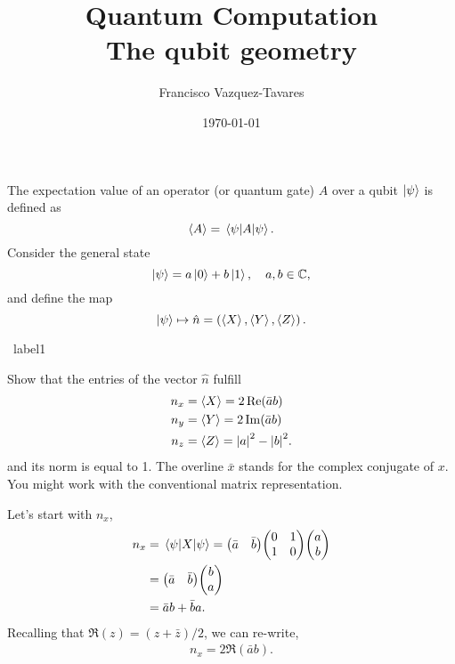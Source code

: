 \documentclass[a4paper]{tufte-handout} %
\title{Quantum Computation\\ The qubit geometry}
\author{Francisco Vazquez-Tavares}
\date{\today} %
\begin{document}
\maketitle %
\justifying


The expectation value of an operator (or quantum gate) $A$ over a qubit $\ket{\psi}$ is defined as
\begin{equation}
    \expval{A} = \expval{A}{\psi}.
\end{equation}
Consider the general state
\begin{equation}
    \ket{\psi} = a\ket{0} + b\ket{1},\quad a,b\in\mathbb{C},
\end{equation}
and define the map
\begin{equation}
    \ket{\psi} \mapsto\hat{n} = \left(\expval{X},\expval{Y},\expval{Z}\right).
\end{equation}

\begin{prob}{~}{label1}

    Show that the entries of the vector $\hat{n}$ fulfill
    \begin{align*}
        n_x &= \expval{X} = 2\Re(\bar{a}b) \\
        n_y &= \expval{Y} = 2\Im(\bar{a}b) \\
        n_z &= \expval{Z} = \abs{a}^2 - \abs{b}^2.
    \end{align*}
    and its norm is equal to \num{1}.
    The overline $\bar{x}$ stands for the complex conjugate of $x$.
    You might work with the conventional matrix representation.

\end{prob}

Let's start with $n_x$,
\begin{align*}
    n_x &= \expval{X}{\psi} = \mqty(\bar{a} & \bar{b})\mqty(\pmat{1})\mqty(a \\ b) \\
        &= \mqty(\bar{a} & \bar{b})\mqty(b \\ a) \\ 
        &= \bar{a}b + \bar{b}a.
\end{align*}
Recalling that $\Re(z)=(z+\bar{z})/2$, we can re-write,
\begin{align*}
    n_x = 2\Re(\bar{a}b).
\end{align*}
\end{document}
